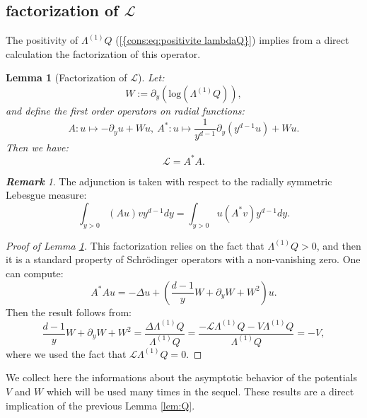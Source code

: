 \documentclass[11pt,a4paper,reqno]{amsart}
\newtheorem{lemma}[theorem]{Lemma}
\theoremstyle{remark}
\newtheorem{remark}[theorem]{\it \bf{Remark}\/}
\numberwithin{equation}{section}
\begin{document}
\subsection{factorization of $\mathcal{L}$}

The positivity of $\Lambda^{(1)}Q$ {{\rm (\ref{{cons:eq:positivite lambdaQ}})}} implies from a direct calculation the factorization of this operator.
\begin{lemma}[Factorization of $\mathcal{L}$]\label{lem:factorisation} Let:
\begin{equation}
W:=\partial_y(\text{log}(\Lambda^{(1)}Q)),
\end{equation}
and define the first order operators on radial functions:
\begin{equation}
A:u\mapsto -\partial_y u+Wu, \ A^*:u\mapsto \frac{1}{y^{d-1}}\partial_y(y^{d-1}u)+Wu.
\end{equation}
Then we have:
\begin{equation}
\mathcal{L}=A^*A.
\end{equation}
\end{lemma}

\begin{remark}
The adjunction is taken with respect to the radially symmetric Lebesgue measure:
$$
\int_{y>0} (Au)vy^{d-1}dy=\int_{y>0} u(A^*v)y^{d-1}dy.
$$
\end{remark}

\begin{proof}[Proof of Lemma \ref{lem:factorisation}] 
This factorization relies on the fact that $\Lambda^{(1)}Q>0$, and then it is a standard property of Schr\"odinger operators with a non-vanishing zero. One can compute:
$$
A^*Au=-\Delta u+(\frac{d-1}{y}W+\partial_y W+W^2)u.
$$
Then the result follows from:
$$
\frac{d-1}{y}W+\partial_y W+W^2=\frac{\Delta \Lambda^{(1)}Q}{\Lambda^{(1)}Q}=\frac{-\mathcal{L}\Lambda^{(1)}Q-V\Lambda^{(1)}Q}{\Lambda^{(1)}Q}=-V,
$$
where we used the fact that $\mathcal{L}\Lambda^{(1)}Q=0$.
\end{proof}

We collect here the informations about the asymptotic behavior of the potentials $V$ and $W$ which will be used many times in the sequel. These results are a direct implication of the previous Lemma \ref{lem:Q}.
\end{document}
